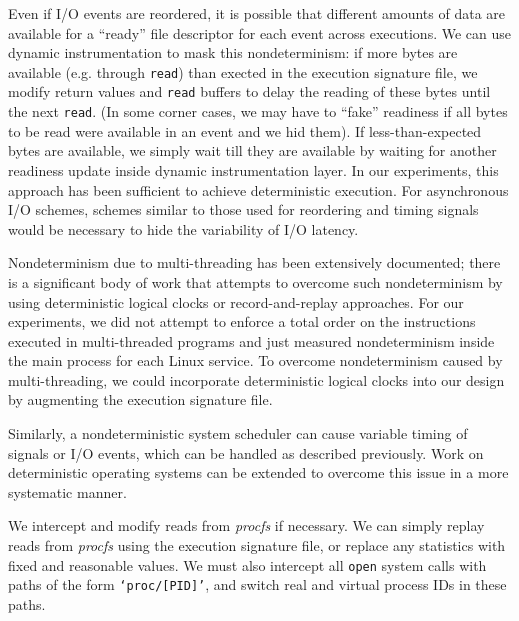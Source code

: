 Even if I/O events are reordered,
it is possible that different amounts
of data are available for a ``ready''
file descriptor for each event
across executions. We can use
dynamic instrumentation to mask
this nondeterminism: if more bytes
are available (e.g. through \texttt{read}) 
than exected in the execution signature
file, we modify return values and \texttt{read}
buffers to delay the reading of these bytes
until the next \texttt{read}. (In some corner
cases, we may have to ``fake'' readiness
if all bytes to be read were available in an event
and we hid them). If less-than-expected
bytes are available, we simply wait
till they are available by waiting for
another readiness update inside 
dynamic instrumentation layer.
In our experiments, this approach has been sufficient to 
achieve deterministic execution.
For asynchronous I/O schemes, schemes
similar to those used for reordering
and timing signals 
would be necessary to hide
the variability of I/O latency.
\newline

 \newline
Nondeterminism due to multi-threading
has been extensively documented; there
is a significant body of work that
attempts to overcome such nondeterminism
by using deterministic logical clocks
or record-and-replay approaches. 
For our experiments, we did not attempt to enforce
a total order on the instructions executed in multi-threaded
programs and just measured nondeterminism inside 
the main process for each Linux service.
To overcome nondeterminism caused
by multi-threading, we could incorporate
deterministic logical clocks 
into our design by augmenting the
execution signature file.

Similarly, a nondeterministic system scheduler
can cause variable timing of signals
or I/O events, which
can be handled as described previously.
Work on deterministic
operating systems can
be extended to overcome this issue
in a more systematic manner. \newline

 \newline
We intercept and modify reads 
from {\em procfs} if necessary. We can simply 
replay reads from {\em procfs} using the execution signature
file, or replace any statistics with fixed and 
reasonable values. We must also intercept
all \texttt{open} system calls with paths
of the form \texttt{`proc/[PID]'},
and switch real and virtual process IDs
in these paths.

